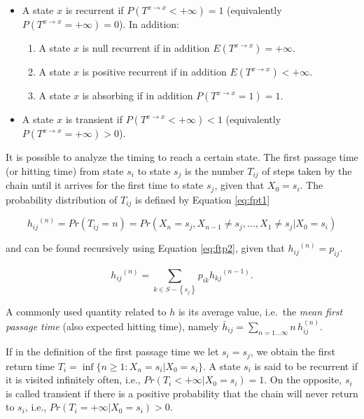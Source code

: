 \documentclass[article,nojss]{jss}
\providecommand{\tightlist}{%
  \setlength{\itemsep}{0pt}\setlength{\parskip}{0pt}}
\begin{document}
\begin{itemize}
\tightlist
\item
  A state \(x\) is recurrent if \(P(T^{x\rightarrow x}<+\infty)=1\) (equivalently \(P(T^{x\rightarrow x}=+\infty)=0\)). In addition:

  \begin{enumerate}
  \def\labelenumi{\arabic{enumi}.}
  \tightlist
  \item
    A state \(x\) is null recurrent if in addition \(E(T^{x\rightarrow x})=+\infty\).
  \item
    A state \(x\) is positive recurrent if in addition \(E(T^{x\rightarrow x})<+\infty\).
  \item
    A state \(x\) is absorbing if in addition \(P(T^{x\rightarrow x}=1)=1\).
  \end{enumerate}
\item
  A state \(x\) is transient if \(P(T^{x\rightarrow x}<+\infty)<1\) (equivalently \(P(T^{x\rightarrow x}=+\infty)>0\)).
\end{itemize}

It is possible to analyze the timing to reach a certain state. The first passage time (or hitting time) from state \(s_{i}\) to state \(s_{j}\) is the number \(T_{ij}\) of steps taken by the chain until it arrives for the first time to state \(s_{j}\), given that \(X_{0} = s_{i}\). The probability distribution of \(T_{ij}\) is defined by Equation \ref{eq:fpt1}

\begin{equation}
{h_{ij}}^{\left( n \right)} = Pr\left( {T_{ij} = n} \right) = Pr\left( X_n = s_j,X_{n - 1} \ne s_{j}, \ldots ,X_1 \ne s_j |X_0 = s_i \right)
\label{eq:fpt1}
\end{equation}

and can be found recursively using Equation \ref{eq:ftp2}, given that \({h_{ij}}^{\left( n \right)} = p_{ij}\).

\begin{equation}
{h_{ij}}^{\left( n \right)} = \sum\limits_{k \in S - \left\{ s_{j} \right\}}^{} {{p_{ik}}{h_{kj}}^{\left( {n - 1} \right)}}.
\label{eq:ftp2}
\end{equation}

A commonly used quantity related to \(h\) is its average value,
i.e.~the \emph{mean first passage time} (also expected hitting time), namely
\(\bar h_{ij}= \sum_{n=1\dots\infty} n \,h_{ij}^{(n)}\).

If in the definition of the first passage time we let \(s_{i}=s_{j}\), we obtain the first return time \(T_{i}=\inf \{ n\geq1:X_{n}=s_{i}|X_{0}=s_{i} \}\). A state \(s_{i}\) is said to be recurrent if it is visited infinitely often, i.e., \(Pr(T_{i}<+\infty|X_{0}=s_{i})=1\). On the opposite, \(s_{i}\) is called transient if there is a positive probability that the chain will never return to \(s_{i}\), i.e., \(Pr(T_{i}=+\infty|X_{0}=s_{i})>0\).
\end{document}
